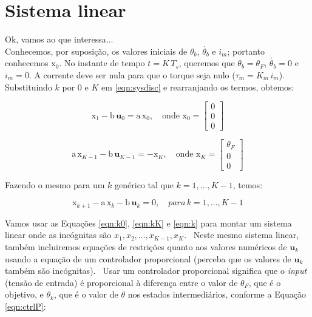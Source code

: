 \documentclass[12pt,a4paper,english,brazil]{article}
\begin{document}
\section{Sistema linear}\label{sec-sislin}

Ok, vamos ao que interessa... \\

Conhecemos, por suposição, os valores iniciais de $\theta_b$, $\dot{\theta_b}$ e $i_m$; portanto conhecemos $\pmb{\mathrm{x}}_0$. No instante de tempo $t = K \, T_s$, queremos que $\theta_b = \theta_F$, $\dot{\theta_b} = 0$ e $i_m = 0$. A corrente deve ser nula para que o torque seja nulo ($\tau_m = K_m \, i_m$). \\

Substituindo $k$ por $0$ e $K$ em \ref{eqn:sysdisc} e rearranjando os termos, obtemos: 

\begin{equation}\label{eqn:k0}
    \pmb{\mathrm{x}}_1 - \mathrm{b} \, \pmb{u}_0 = \mathrm{a} \, \pmb{\mathrm{x}}_0,
    \quad
    \text{onde }
        \pmb{\mathrm{x}}_0 = 
        \begin{bmatrix}
            0 \\
            0 \\
            0
        \end{bmatrix}
\end{equation}

\begin{equation}\label{eqn:kK}
    \mathrm{a} \, \pmb{\mathrm{x}}_{K-1} - \mathrm{b} \, \pmb{u}_{K - 1} = - \pmb{\mathrm{x}}_K, 
    \quad
    \text{onde }
        \pmb{\mathrm{x}}_K = 
        \begin{bmatrix}
            \theta_F \\
            0 \\
            0
        \end{bmatrix}
\end{equation}

Fazendo o mesmo para um $k$ genérico tal que $k = 1, ..., K - 1$, temos: 

\begin{equation}\label{eqn:k}
    \pmb{\mathrm{x}}_{k+1} - \mathrm{a} \, \pmb{\mathrm{x}}_k - \mathrm{b} \, \pmb{u}_k = 0, 
    \quad para \, k = 1, ..., K - 1
\end{equation}

Vamos usar as Equações \ref{eqn:k0}, \ref{eqn:kK} e  \ref{eqn:k} para montar um sistema linear onde as incógnitas são $x_1, x_2, \dots, x_{K-1}, x_K$.
\
Neste mesmo sistema linear, também incluiremos equações de restrições quanto aos valores numéricos de $\pmb{u}_k$ usando a equação de um controlador proporcional (perceba que os valores de $\pmb{u}_k$ também são incógnitas). 
\
Usar um controlador proporcional significa que o \textit{input} (tensão de entrada) é proporcional à diferença entre o valor de $\theta_F$, que é o objetivo, e $\theta_k$, que é o valor de $\theta$ nos estados intermediários, conforme a Equação \ref{eqn:ctrlP}:
\end{document}
